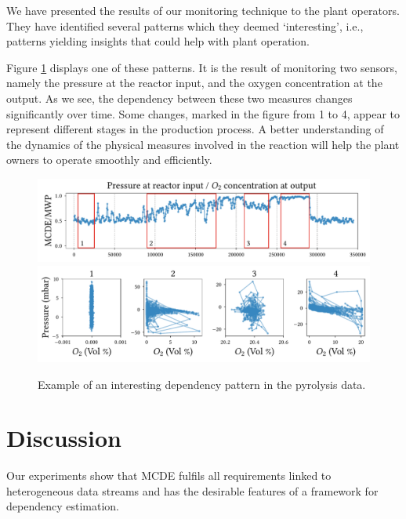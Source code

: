 We have presented the results of our monitoring technique to the plant operators. 
They have identified several patterns which they deemed `interesting', i.e., patterns yielding insights that could help with plant operation. 

Figure \ref{fig:real-world-pattern} displays one of these patterns. 
It is the result of monitoring two sensors, namely the pressure at the reactor input, and the oxygen concentration at the output. 
As we see, the dependency between these two measures changes significantly over time. 
Some changes, marked in the figure from 1 to 4, appear to represent different stages in the production process. 
A better understanding of the dynamics of the physical measures involved in the reaction will help the plant owners to operate smoothly and efficiently. 

\begin{figure}
\centering
    \includegraphics[width=1\linewidth]{part2-figures/Dep_example_thesis-compressed.pdf}
    \includegraphics[width=1\linewidth]{part2-figures/Dep_example_details_thesis-compressed.pdf}
    \caption{Example of an interesting dependency pattern in the pyrolysis data.}
    \label{fig:real-world-pattern}
\end{figure}

\section{Discussion}

Our experiments show that \gls{MCDE} fulfils all requirements linked to heterogeneous data streams and has the desirable features of a framework for dependency estimation. %

